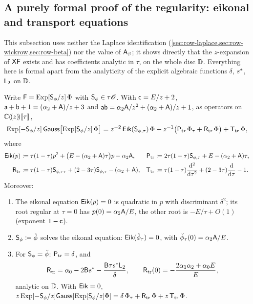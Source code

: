 \subsection{A purely formal proof of the regularity: eikonal and transport equations}
\label{sec:row-eik}

This subsection uses neither the Laplace identification (\cref{sec:row-laplace,sec:row-wickrow,sec:row-beta}) nor the value of $\mathsf{A}_{\beta}$; it shows directly that the $z$-expansion of $\mathsf{X}\mathsf{F}$ exists and has coefficients analytic in $\tau$, on the whole disc $\mathbb{D}$. Everything here is formal apart from the analyticity of the explicit algebraic functions $\delta$, $s^{\ast}$, $\mathsf{L}_2$ on $\mathbb{D}$.

\begin{lem}
\label{lem:row-eik}
Write $\mathsf{F}=\mathrm{Exp}[\mathsf{S}_{\phi}/z]\,\Phi$ with $\mathsf{S}_{\phi}\in\tau\mathscr{O}$. With $\mathsf{c}=E/z+2$, $\mathsf{a}+\mathsf{b}+1=(\alpha_2+\mathsf{A})/z+3$ and $\mathsf{a}\mathsf{b}=\alpha_2\mathsf{A}/z^2+(\alpha_2+\mathsf{A})/z+1$, as operators on $\mathbb{C}(\!(z)\!)[\![ \tau ]\!]$,
\begin{equation}
\label{eq:row-eik}
\mathrm{Exp}[-\mathsf{S}_{\phi}/z]\,\mathsf{Gauss}\big[\mathrm{Exp}[\mathsf{S}_{\phi}/z]\,\Phi\big]=z^{-2}\,\mathsf{Eik}(\mathsf{S}_{\phi,\tau})\,\Phi+z^{-1}\big(\mathsf{P}_{\mathrm{tr}}\,\Phi_\tau+\mathsf{R}_{\mathrm{tr}}\,\Phi\big)+\mathsf{T}_{\mathrm{tr}}\,\Phi,
\end{equation}
where
\begin{align*}
\mathsf{Eik}(p)&\coloneqq\tau(1-\tau)p^2+\big(E-(\alpha_2+\mathsf{A})\tau\big)p-\alpha_2\mathsf{A}, &
\mathsf{P}_{\mathrm{tr}}&\coloneqq2\tau(1-\tau)\mathsf{S}_{\phi,\tau}+E-(\alpha_2+\mathsf{A})\tau,\\
\mathsf{R}_{\mathrm{tr}}&\coloneqq\tau(1-\tau)\mathsf{S}_{\phi,\tau\tau}+(2-3\tau)\mathsf{S}_{\phi,\tau}-(\alpha_2+\mathsf{A}), &
\mathsf{T}_{\mathrm{tr}}&\coloneqq\tau(1-\tau)\frac{\mathrm{d}^2}{\mathrm{d}\tau^2}+(2-3\tau)\frac{\mathrm{d}}{\mathrm{d}\tau}-1 .
\end{align*}
Moreover:
\begin{enumerate}
\item The eikonal equation $\mathsf{Eik}(p)=0$ is quadratic in $p$ with discriminant $\delta^2$; its root regular at $\tau=0$ has $p(0)=\alpha_2\mathsf{A}/E$, the other root is $-E/\tau+O(1)$ (exponent $1-\mathsf{c}$).
\item $\mathsf{S}_{\phi}\coloneqq\breve{\phi}$ solves the eikonal equation: $\mathsf{Eik}(\breve{\phi}_\tau)=0$, with $\breve{\phi}_\tau(0)=\alpha_2\mathsf{A}/E$.
\item For $\mathsf{S}_{\phi}=\breve{\phi}$: $\mathsf{P}_{\mathrm{tr}}=\delta$, and
\[
\mathsf{R}_{\mathrm{tr}}=\alpha_0-2\mathsf{B}s^{\ast}-\frac{\mathsf{B}\tau s^{\ast}\mathsf{L}_2}{\delta},\qquad \mathsf{R}_{\mathrm{tr}}(0)=-\frac{2\alpha_1\alpha_2+\alpha_0E}{E},
\]
analytic on $\mathbb{D}$. With $\mathsf{Eik}=0$, $z\,\mathrm{Exp}[-\mathsf{S}_{\phi}/z]\mathsf{Gauss}[\mathrm{Exp}[\mathsf{S}_{\phi}/z]\Phi]=\delta\,\Phi_\tau+\mathsf{R}_{\mathrm{tr}}\,\Phi+z\,\mathsf{T}_{\mathrm{tr}}\,\Phi$.
\end{enumerate}
\end{lem}

